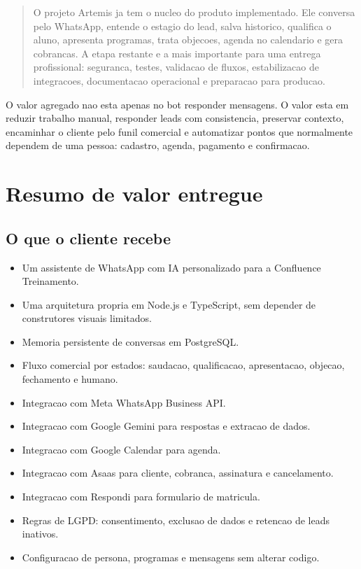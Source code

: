 \documentclass[11pt,a4paper]{article}
\begin{document}
\begin{quote}
  O projeto Artemis ja tem o nucleo do produto implementado. Ele conversa pelo WhatsApp, entende o estagio do lead, salva historico, qualifica o aluno, apresenta programas, trata objecoes, agenda no calendario e gera cobrancas. A etapa restante e a mais importante para uma entrega profissional: seguranca, testes, validacao de fluxos, estabilizacao de integracoes, documentacao operacional e preparacao para producao.
\end{quote}

O valor agregado nao esta apenas no bot responder mensagens. O valor esta em reduzir trabalho manual, responder leads com consistencia, preservar contexto, encaminhar o cliente pelo funil comercial e automatizar pontos que normalmente dependem de uma pessoa: cadastro, agenda, pagamento e confirmacao.

\section{Resumo de valor entregue}

\subsection{O que o cliente recebe}

\begin{itemize}
  \item Um assistente de WhatsApp com IA personalizado para a Confluence Treinamento.
  \item Uma arquitetura propria em Node.js e TypeScript, sem depender de construtores visuais limitados.
  \item Memoria persistente de conversas em PostgreSQL.
  \item Fluxo comercial por estados: saudacao, qualificacao, apresentacao, objecao, fechamento e humano.
  \item Integracao com Meta WhatsApp Business API.
  \item Integracao com Google Gemini para respostas e extracao de dados.
  \item Integracao com Google Calendar para agenda.
  \item Integracao com Asaas para cliente, cobranca, assinatura e cancelamento.
  \item Integracao com Respondi para formulario de matricula.
  \item Regras de LGPD: consentimento, exclusao de dados e retencao de leads inativos.
  \item Configuracao de persona, programas e mensagens sem alterar codigo.
\end{itemize}
\end{document}
